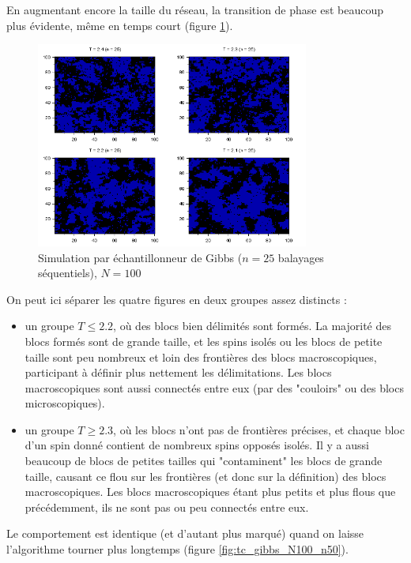 \documentclass[a4paper,11pt]{article}
\begin{document}
En augmentant encore la taille du réseau, la transition de phase est beaucoup plus évidente, même en temps court (figure \ref{fig:tc_gibbs_N100_n25}).
\begin{figure}[!htbp]
	\label{fig:tc_gibbs_N100_n25}
	\includegraphics[width=0.8\textwidth]{temperature_critique_gibbs_N100_n25.png}
	\caption{Simulation par échantillonneur de Gibbs ($n = 25$ balayages séquentiels), $N = 100$}
\end{figure}
On peut ici séparer les quatre figures en deux groupes assez distincts :
\begin{itemize}
	\item un groupe $T \leq 2.2$, où des blocs bien délimités sont formés. La majorité des blocs formés sont de grande taille, et les spins isolés ou les blocs de petite taille sont peu nombreux et loin des frontières des blocs macroscopiques, participant à définir plus nettement les délimitations. Les blocs macroscopiques sont aussi connectés entre eux (par des "couloirs" ou des blocs microscopiques).
	\item un groupe $T \geq 2.3$, où les blocs n'ont pas de frontières précises, et chaque bloc d'un spin donné contient de nombreux spins opposés isolés. Il y a aussi beaucoup de blocs de petites tailles qui "contaminent" les blocs de grande taille, causant ce flou sur les frontières (et donc sur la définition) des blocs macroscopiques. Les blocs macroscopiques étant plus petits et plus flous que précédemment, ils ne sont pas ou peu connectés entre eux.
\end{itemize}
Le comportement est identique (et d'autant plus marqué) quand on laisse l'algorithme tourner plus longtemps (figure \ref{fig:tc_gibbs_N100_n50}).
\end{document}
